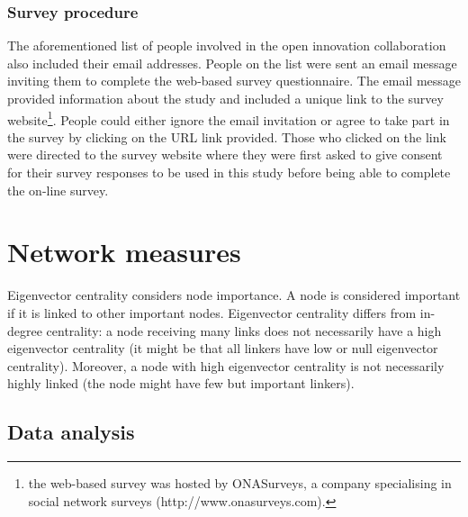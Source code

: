 \subsubsection{Survey procedure}

The aforementioned list of people involved in the open innovation collaboration also included their email addresses. People on the list were sent an email message inviting them to complete the web-based survey questionnaire. The email message provided information about the study and included a unique link to the survey website\footnote{the web-based survey was hosted by ONASurveys, a company specialising in social network surveys (http://www.onasurveys.com).}. People could either ignore the email invitation or agree to take part in the survey by clicking on the URL link provided. Those who clicked on the link were directed to the survey website where they were first asked to give consent for their survey responses to be used in this study before being able to complete the on-line survey.\medskip



 



\section{Network measures}

Eigenvector centrality considers node importance. A node is considered important if it is linked to other important nodes. Eigenvector centrality differs from in-degree centrality: a node receiving many links does not necessarily have a high eigenvector centrality (it might be that all linkers have low or null eigenvector centrality). Moreover, a node with high eigenvector centrality is not necessarily highly linked (the node might have few but important linkers). 

\subsection{Data analysis}

